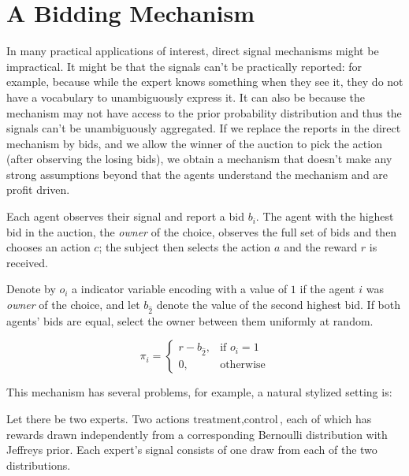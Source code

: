 \section{A Bidding Mechanism}

In many practical applications of interest, direct signal mechanisms might be impractical. It might be that the signals can't be practically reported: for example, because while the expert knows something when they see it, they do not have a vocabulary to unambiguously express it. It can also be because the mechanism may not have access to the prior  probability distribution and thus the signals can't be unambiguously aggregated. 
If we replace the reports in the direct mechanism by bids, and we allow the winner of the auction to pick the action (after observing the losing bids), we obtain a mechanism that doesn't make any strong assumptions beyond that the agents understand the mechanism and are profit driven.



\begin{mech}

Each agent observes their signal and report a bid $b_i$.
The agent with the highest bid in the auction, the \emph{owner} of the choice, observes the full set of bids and then chooses an action $c$; the subject then selects the action $a$ and the reward $r$ is received. 

Denote by $o_{i}$ a indicator variable encoding with a value of $1$ if the agent $i$ was  \emph{owner} of the choice, and let $b_{\hat{2}}$ denote the value of the second highest  bid. If both agents' bids are equal, select the owner between them uniformly at random.

\[
    \pi_i =  
\begin{cases}
        r - b_{\hat{2}} ,& \text{if } o_{i} = 1 \\
		0,              & \text{otherwise}
\end{cases}
\]
\end{mech}


This mechanism has several problems, for example, a natural stylized setting is:


\begin{eg}\label{eg:two-iid-signals}
	Let there be two experts. Two actions ${\text{treatment},\text{control}}$, each of which has rewards drawn independently from a corresponding Bernoulli distribution with Jeffreys prior. Each expert's signal consists of one draw from each of the two distributions.
\end{eg}

